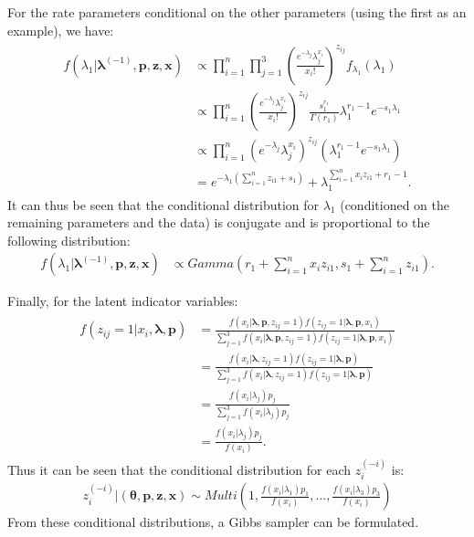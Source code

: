 \begin{DoubleSpace*}
For the rate parameters conditional on the other parameters (using the first as an example), we have:
\begin{align}
\begin{split}
	f(\lambda_1|\boldsymbol{\lambda}^{(-1)},\textbf{p},\textbf{z},\textbf{x})&\propto \prod_{i=1}^{n} \prod_{j=1}^3 \left(\frac{e^{-\lambda_j}\lambda_j^{x_i}}{x_i!}\right)^{z_{ij}} f_{\lambda_1}(\lambda_1) \\
	&\propto \prod_{i=1}^{n} \left(\frac{e^{-\lambda_j}\lambda_j^{x_i}}{x_i!}\right)^{z_{ij}} \frac{s_1^{r_1}}{\Gamma(r_1)} \lambda_1^{r_1-1} e^{-s_1 \lambda_1}\\
	&\propto \prod_{i=1}^{n} \left( e^{-\lambda_j}\lambda_j^{x_i} \right)^{z_{ij}} \left( \lambda_1^{r_1-1} e^{-s_1 \lambda_1} \right) \\
	&= e^{-\lambda_1 (\sum_{i=1}^n z_{i1}+s_1)}+\lambda_1^{\sum_{i=1}^n x_i z_{i1}+r_1-1}.
\end{split}
\end{align}
It can thus be seen that the conditional distribution for $\lambda_1$ (conditioned on the remaining parameters and the data) is conjugate and is proportional to the following distribution:
\begin{align}
		f(\lambda_1|\boldsymbol{\lambda}^{(-1)},\textbf{p},\textbf{z},\textbf{x})&\propto Gamma \left( r_1+\sum_{i=1}^n x_i z_{i1}, s_1+\sum_{i=1}^n z_{i1} \right). 
\end{align}

Finally, for the latent indicator variables:
\begin{align}
	\begin{split}
f(z_{ij}=1|x_i,\boldsymbol{\lambda},\textbf{p})&=
\frac{f(x_i|\boldsymbol{\lambda},\textbf{p},z_{ij}=1)f(z_{ij}=1|\boldsymbol{\lambda},\textbf{p},x_i)}{\sum_{j=1}^3 f(x_i|\boldsymbol{\lambda},\textbf{p},z_{ij}=1)f(z_{ij}=1|\boldsymbol{\lambda},\textbf{p},x_i)} \\
&=\frac{f(x_i|\boldsymbol{\lambda},z_{ij}=1)f(z_{ij}=1|\boldsymbol{\lambda},\textbf{p})}{\sum_{j=1}^3 f(x_i|\boldsymbol{\lambda},z_{ij}=1)f(z_{ij}=1|\boldsymbol{\lambda},\textbf{p})} \\
&=\frac{f(x_i|\lambda_j)p_j}{\sum_{j=1}^3 f(x_i|\lambda_j)p_j} \\
&= \frac{f(x_i|\lambda_j)p_j}{ f(x_i)}.
	\end{split}
\end{align}
Thus it can be seen that the conditional distribution for each $z_i^{(-i)}$ is:
\begin{align}
	z_i^{(-i)} |(\boldsymbol{\theta},\textbf{p},\textbf{z},\textbf{x} )\sim Multi \left(1,\frac{f(x_i|\lambda_1)p_1}{ f(x_i)},\hdots , \frac{f(x_i|\lambda_3)p_3}{ f(x_i)} \right)
\end{align}
From these conditional distributions, a Gibbs sampler can be formulated.

\end{DoubleSpace*}